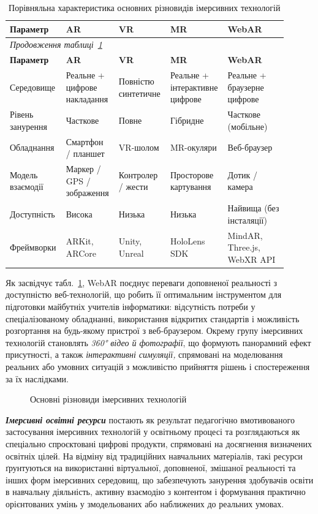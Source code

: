 {%
\begin{longtable}{|p{0.18\linewidth}|p{0.17\linewidth}|p{0.17\linewidth}|p{0.17\linewidth}|p{0.21\linewidth}|}
\caption{Порівняльна характеристика основних різновидів імерсивних технологій}\label{tab:ar_vr_mr_comparison}\\
\hline
\textbf{Параметр} & \textbf{AR} & \textbf{VR} & \textbf{MR} & \textbf{WebAR} \\
\hline
\endfirsthead
\multicolumn{5}{l}{\textit{Продовження таблиці~\ref{tab:ar_vr_mr_comparison}}}\\
\hline
\textbf{Параметр} & \textbf{AR} & \textbf{VR} & \textbf{MR} & \textbf{WebAR} \\
\hline
\endhead
\hline
\endfoot
Середовище & Реальне + цифрове накладання & Повністю синтетичне & Реальне + інтерактивне цифрове & Реальне + браузерне цифрове \\
\hline
Рівень занурення & Часткове & Повне & Гібридне & Часткове (мобільне) \\
\hline
Обладнання & Смартфон / планшет & VR-шолом & MR-окуляри & Веб-браузер \\
\hline
Модель взаємодії & Маркер / GPS / зображення & Контролер / жести & Просторове картування & Дотик / камера \\
\hline
Доступність & Висока & Низька & Низька & Найвища (без інсталяції) \\
\hline
Фреймворки & ARKit, ARCore & Unity, Unreal & HoloLens SDK & MindAR, Three.js, WebXR API \\
\hline
\end{longtable}
}

Як засвідчує табл.~\ref{tab:ar_vr_mr_comparison}, WebAR поєднує переваги доповненої реальності з доступністю веб-технологій, що робить її оптимальним інструментом для підготовки майбутніх учителів інформатики: відсутність потреби у спеціалізованому обладнанні, використання відкритих стандартів і можливість розгортання на будь-якому пристрої з веб-браузером. Окрему групу імерсивних технологій становлять \emph{360° відео й фотографії}, що формують панорамний ефект присутності, а також \emph{інтерактивні симуляції,} спрямовані на моделювання реальних або умовних ситуацій з можливістю прийняття рішень і спостереження за їх наслідками.

\begin{figure}[!h]
\centering

\caption{Основні різновиди імерсивних технологій}
\label{fig:1.3}
\end{figure}

\emph{\textbf{Імерсивні освітні ресурси}} постають як результат педагогічно вмотивованого застосування імерсивних технологій у освітньому процесі та розглядаються як спеціально спроєктовані цифрові продукти, спрямовані на досягнення визначених освітніх цілей. На відміну від традиційних навчальних матеріалів, такі ресурси ґрунтуються на використанні віртуальної, доповненої, змішаної реальності та інших форм імерсивних середовищ, що забезпечують занурення здобувачів освіти в навчальну діяльність, активну взаємодію з контентом і формування практично орієнтованих умінь у змодельованих або наближених до реальних умовах.

